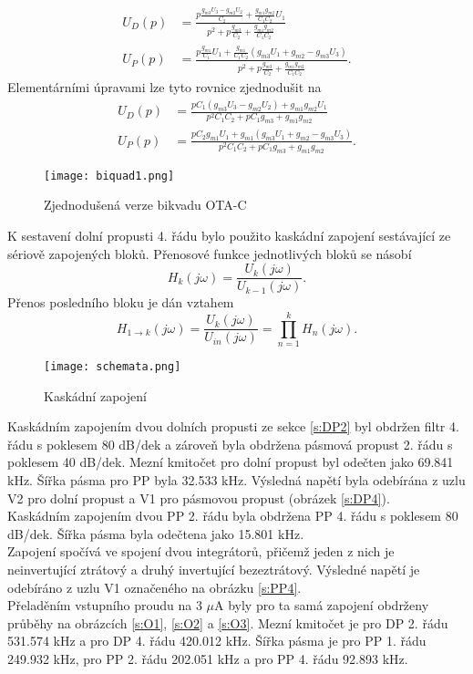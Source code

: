 \begin{align}
U_D(p) &= \frac{p\frac{g_{m3}U_3-g_{m2}U_2}{C_2}+\frac{g_{m1}g_{m2}}{C_1C_2}U_1}{p^2 + p\frac{g_{m3}}{C_2} + \frac{g_{m1}g_{m2}}{C_1C_2}}\\
U_P(p) &= \frac{p\frac{g_{m1}}{C_1}U_1 + \frac{g_{m1}}{C_1C_2}(g_{m3}U_1+g_{m2}-g_{m3}U_3)}{p^2 + p\frac{g_{m3}}{C_2} + \frac{g_{m1}g_{m2}}{C_1C_2}}.
\end{align}
\noindent Elementárními úpravami lze tyto rovnice zjednodušit na
\begin{align}
U_D(p) &= \frac{pC_1(g_{m3}U_3 - g_{m2}U_2) + g_{m1}g_{m2}U_1}{p^2C_1C_2 + pC_1g_{m3} + g_{m1}g_{m2}}\\
U_P(p) &= \frac{pC_2g_{m1}U_1 + g_{m1}(g_{m3}U_1 + g_{m2} - g_{m3}U_3)}{p^2C_1C_2 + pC_1g_{m3} + g_{m1}g_{m2}}.
\end{align}
\begin{figure}[h]
\centering
\texttt{[image: biquad1.png]}
\caption[Zjednodušená verze bikvadu OTA-C]{Zjednodušená verze bikvadu OTA-C \label{s:BIK2}}
\end{figure}
\noindent K sestavení dolní propusti 4. řádu bylo použito kaskádní zapojení sestávající ze sériově zapojených bloků. Přenosové funkce jednotlivých bloků se násobí
\begin{equation}
H_k(j\omega) = \frac{U_k (j\omega)}{U_{k-1}(j\omega)}.
\end{equation}
Přenos posledního bloku je dán vztahem
\begin{equation}
H_{1 \rightarrow k}(j\omega) = \frac{U_k (j\omega)}{U_{in}(j\omega)} = \prod _{n=1}^{k} H_n(j\omega).
\end{equation}
\begin{figure}[h]
\centering
\texttt{[image: schemata.png]}
\caption[Kaskádní zapojení]{Kaskádní zapojení \cite{12}}
\end{figure}
Kaskádním zapojením dvou dolních propusti ze sekce \ref{s:DP2} byl obdržen filtr 4. řádu s poklesem 80 dB/dek a zároveň byla obdržena pásmová propust 2. řádu s poklesem 40 dB/dek. Mezní kmitočet pro dolní propust byl odečten jako 69.841 kHz. Šířka pásma pro PP byla 32.533 kHz. Výsledná napětí byla odebírána z uzlu V2 pro dolní propust a V1 pro pásmovou propust (obrázek \ref{s:DP4}). \\
\noindent Kaskádním zapojením dvou PP 2. řádu byla obdržena PP 4. řádu s poklesem 80 dB/dek. Šířka pásma byla odečtena jako 15.801 kHz.\\ Zapojení spočívá ve spojení dvou integrátorů, přičemž jeden z nich je neinvertující ztrátový a druhý invertující bezeztrátový. Výsledné napětí je odebíráno z uzlu V1 označeného na obrázku \ref{s:PP4}.\\
\noindent Přeladěním vstupního proudu na 3 $\mu$A byly pro ta samá zapojení obdrženy průběhy na obrázcích \ref{s:O1}, \ref{s:O2} a  \ref{s:O3}. Mezní kmitočet je pro DP 2. řádu 531.574 kHz a pro DP 4. řádu 420.012 kHz. Šířka pásma je pro PP 1. řádu 249.932 kHz, pro PP 2. řádu 202.051 kHz a pro PP 4. řádu 92.893 kHz.